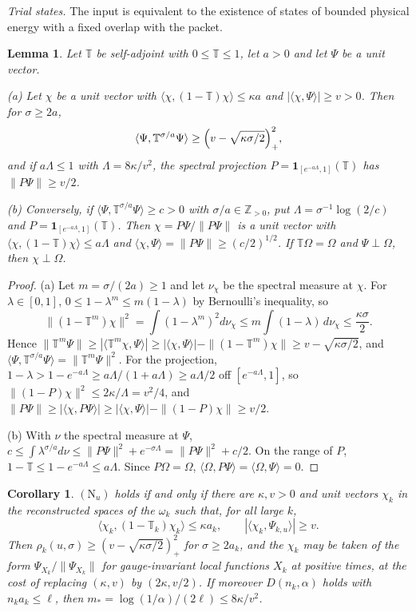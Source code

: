 \documentclass[11pt]{amsart}
\newtheorem{lemma}[theorem]{Lemma}
\newtheorem{corollary}[theorem]{Corollary}
\theoremstyle{definition}
\theoremstyle{remark}
\numberwithin{equation}{section}
\newcommand{\Z}{\mathbb{Z}}
\newcommand{\ip}[2]{\langle #1,#2\rangle}
\begin{document}
\emph{Trial states.} The input is equivalent to the existence of states of
bounded physical energy with a fixed overlap with the packet.

\begin{lemma}\label{lem:trial}
Let $\mathbb T$ be self-adjoint with $0\le\mathbb T\le1$, let $a>0$ and let
$\Psi$ be a unit vector.

\textup{(a)} Let $\chi$ be a unit vector with $\ip\chi{(1-\mathbb T)\chi}\le
\kappa a$ and $|\ip\chi\Psi|\ge v>0$. Then for $\sigma\ge2a$,
\[
\ip\Psi{\mathbb T^{\sigma/a}\Psi}\ge\Bigl(v-\sqrt{\kappa\sigma/2}\Bigr)_+^2 ,
\]
and if $a\Lambda\le1$ with $\Lambda=8\kappa/v^2$, the spectral projection
$P=\mathbf1_{[e^{-a\Lambda},1]}(\mathbb T)$ has $\|P\Psi\|\ge v/2$.

\textup{(b)} Conversely, if $\ip\Psi{\mathbb T^{\sigma/a}\Psi}\ge c>0$ with
$\sigma/a\in\Z_{>0}$, put $\Lambda=\sigma^{-1}\log(2/c)$ and
$P=\mathbf1_{[e^{-a\Lambda},1]}(\mathbb T)$. Then $\chi=P\Psi/\|P\Psi\|$ is a
unit vector with $\ip\chi{(1-\mathbb T)\chi}\le a\Lambda$ and
$\ip\chi\Psi=\|P\Psi\|\ge(c/2)^{1/2}$. If $\mathbb T\Omega=\Omega$ and
$\Psi\perp\Omega$, then $\chi\perp\Omega$.
\end{lemma}

\begin{proof}
(a) Let $m=\sigma/(2a)\ge1$ and let $\nu_\chi$ be the spectral measure at
$\chi$. For $\lambda\in[0,1]$, $0\le1-\lambda^m\le m(1-\lambda)$ by
Bernoulli's inequality, so
\[
\|(1-\mathbb T^m)\chi\|^2=\int(1-\lambda^m)^2d\nu_\chi\le
m\int(1-\lambda)\,d\nu_\chi\le\frac{\kappa\sigma}2 .
\]
Hence $\|\mathbb T^m\Psi\|\ge|\ip{\mathbb T^m\chi}\Psi|\ge|\ip\chi\Psi|-
\|(1-\mathbb T^m)\chi\|\ge v-\sqrt{\kappa\sigma/2}$, and
$\ip\Psi{\mathbb T^{\sigma/a}\Psi}=\|\mathbb T^m\Psi\|^2$. For the projection,
$1-\lambda>1-e^{-a\Lambda}\ge a\Lambda/(1+a\Lambda)\ge a\Lambda/2$ off
$[e^{-a\Lambda},1]$, so $\|(1-P)\chi\|^2\le2\kappa/\Lambda=v^2/4$, and
$\|P\Psi\|\ge|\ip\chi{P\Psi}|\ge|\ip\chi\Psi|-\|(1-P)\chi\|\ge v/2$.

(b) With $\nu$ the spectral measure at $\Psi$,
$c\le\int\lambda^{\sigma/a}d\nu\le\|P\Psi\|^2+e^{-\sigma\Lambda}=\|P\Psi\|^2+
c/2$. On the range of $P$, $1-\mathbb T\le1-e^{-a\Lambda}\le a\Lambda$. Since
$P\Omega=\Omega$, $\ip\Omega{P\Psi}=\ip\Omega\Psi=0$.
\end{proof}

\begin{corollary}\label{cor:trial}
$(\mathrm N_u)$ holds if and only if there are $\kappa,v>0$ and unit vectors
$\chi_k$ in the reconstructed spaces of the $\omega_k$ such that, for all
large $k$,
\[
\ip{\chi_k}{(1-\mathbb T_k)\chi_k}\le\kappa a_k,\qquad
|\ip{\chi_k}{\Psi_{k,u}}|\ge v .
\]
Then $\rho_k(u,\sigma)\ge(v-\sqrt{\kappa\sigma/2})_+^2$ for $\sigma\ge2a_k$,
and the $\chi_k$ may be taken of the form $\Psi_{X_k}/\|\Psi_{X_k}\|$ for
gauge-invariant local functions $X_k$ at positive times, at the cost of
replacing $(\kappa,v)$ by $(2\kappa,v/2)$. If moreover $D(n_k,\alpha)$ holds
with $n_ka_k\le\ell$, then $m_*=\log(1/\alpha)/(2\ell)\le8\kappa/v^2$.
\end{corollary}
\end{document}
